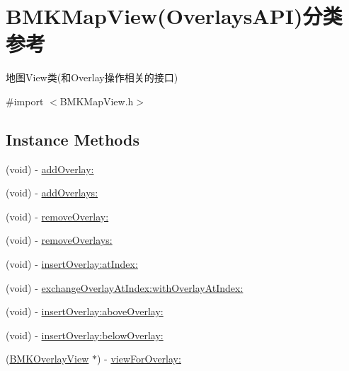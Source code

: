 \hypertarget{category_b_m_k_map_view_07_overlays_a_p_i_08}{}\section{B\+M\+K\+Map\+View(Overlays\+A\+P\+I)分类 参考}
\label{category_b_m_k_map_view_07_overlays_a_p_i_08}


地图\+View类(和\+Overlay操作相关的接口)  




{\ttfamily \#import $<$B\+M\+K\+Map\+View.\+h$>$}

\subsection*{Instance Methods}
\begin{DoxyCompactItemize}
\item 
(void) -\/ \hyperlink{category_b_m_k_map_view_07_overlays_a_p_i_08_af85ad6091568df29d9e7c3dea82a1a2b}{add\+Overlay\+:}
\item 
(void) -\/ \hyperlink{category_b_m_k_map_view_07_overlays_a_p_i_08_ab7d29d948515cc6d947d6aa63f904168}{add\+Overlays\+:}
\item 
(void) -\/ \hyperlink{category_b_m_k_map_view_07_overlays_a_p_i_08_a3be1f2a019df3ff971f6a36f142e55be}{remove\+Overlay\+:}
\item 
(void) -\/ \hyperlink{category_b_m_k_map_view_07_overlays_a_p_i_08_a3eb7909fb1adce117c1de432fd5d816a}{remove\+Overlays\+:}
\item 
(void) -\/ \hyperlink{category_b_m_k_map_view_07_overlays_a_p_i_08_adc0775a2651c1e4099f93d9c1bbffe3d}{insert\+Overlay\+:at\+Index\+:}
\item 
(void) -\/ \hyperlink{category_b_m_k_map_view_07_overlays_a_p_i_08_a62c1c29b8e5b408ba0c40411a3c1f50f}{exchange\+Overlay\+At\+Index\+:with\+Overlay\+At\+Index\+:}
\item 
(void) -\/ \hyperlink{category_b_m_k_map_view_07_overlays_a_p_i_08_ad94b45c4df7978e3a6095918323496d3}{insert\+Overlay\+:above\+Overlay\+:}
\item 
(void) -\/ \hyperlink{category_b_m_k_map_view_07_overlays_a_p_i_08_a73dfe9f74d722b7b1fc477e791f34653}{insert\+Overlay\+:below\+Overlay\+:}
\item 
(\hyperlink{interface_b_m_k_overlay_view}{B\+M\+K\+Overlay\+View} $\ast$) -\/ \hyperlink{category_b_m_k_map_view_07_overlays_a_p_i_08_aa88093440ad22f7af9cf9a36051f662d}{view\+For\+Overlay\+:}
\end{DoxyCompactItemize}
